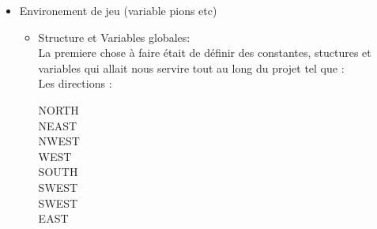 \documentclass{article}
\begin{document}
\begin{itemize}
    \item Environement de jeu (variable pions etc)
    \begin{itemize}
        \item Structure et Variables globales:
        \\
        La premiere chose à faire était de définir des constantes, stuctures et variables qui allait nous servire tout au long du projet tel que : \\
        Les directions :
        \\
        \begin{center}
        \begin{multicols}{2}
        
            NORTH \\ NEAST  \\ NWEST \\ WEST \\ SOUTH \\ SWEST \\ SWEST \\ EAST  
        

\end{multicols}
\end{center}
\end{itemize}
\end{itemize}
\end{document}
